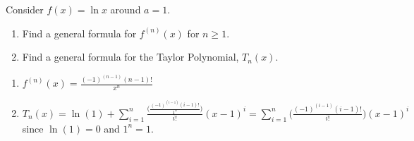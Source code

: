 \begin{enumialphparenastyle}
\begin{ex} 
Consider $f(x)=\ln x$ around $a=1$.
\begin{enumerate}
	\item	Find a general formula for $f^{(n)}(x)$ for $n\geq 1$.
	\item	Find a general formula for the Taylor Polynomial, $T_n(x)$.
\end{enumerate}
\begin{sol}
\begin{enumerate}
	\item	$f^{(n)}(x)=\frac{(-1)^{(n-1)}(n-1)!}{x^n}$
	\item	$T_n(x)=\ln (1)+\displaystyle\sum_{i=1}^{n} \frac{\big(\frac{(-1)^{(i-1)}(i-1)!}{1^n}\big)}{i!}(x-1)^i=\displaystyle\sum_{i=1}^{n} \bigg(\frac{(-1)^{(i-1)}(i-1)!}{i!}\bigg)(x-1)^i$ since $\ln (1)=0$ and $1^n=1$.
\end{enumerate}
\end{sol}
\end{ex}

%
%

\end{enumialphparenastyle}